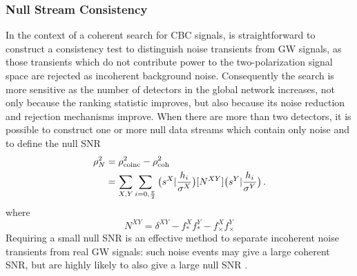 \documentclass[binding=0.6cm, LaM]{sapthesis}
\begin{document}
\subsubsection{Null Stream Consistency}
	In the context of a coherent search for CBC signals,
	is straightforward to construct a consistency test to distinguish noise transients from GW signals,
	as those transients which do not contribute power to the two-polarization signal space are rejected as incoherent background noise. 
	Consequently the search is more sensitive as the number of detectors in the global network increases, 
	not only because the ranking statistic improves, but also because its noise reduction and rejection mechanisms improve. 
	When there are more than two detectors, it is possible to construct one or more null data streams 
	which contain only noise and to define the null SNR 
                \begin{align}
                        \rho^2_N &= \rho^2_{\rm coinc} - \rho^2_{\rm coh} \\
					&= \sum_{X,Y}\sum_{i=0,{{\pi}\over{2}}}  \big(s^X|{{h_i}\over{\sigma^X}}\big)[N^{XY}]\big( s^Y|{{h_i}\over{\sigma^Y}}\big)\,. 
                \end{align}
	where
                \begin{equation}
			N^{XY} = \delta^{XY}-f^X_*f^Y_* - f^X_{\times}f^Y_{\times}
                \end{equation}
	Requiring a small null SNR is an effective method to separate incoherent noise transients from real GW signals: 
	such noise events may give a large coherent SNR, but are highly likely to also give a large null SNR \cite{45}.
\end{document}
